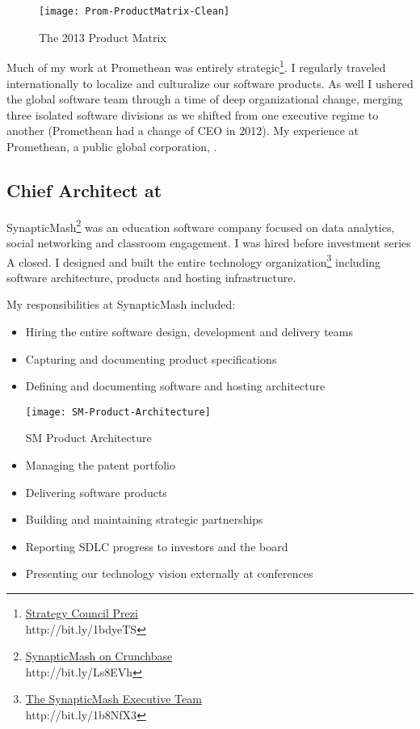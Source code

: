 \begin{centering}
\begin{figure}%
  \texttt{[image: Prom-ProductMatrix-Clean]}
  \caption{The 2013 Product Matrix}
  \label{fig:PromSide}
\end{figure}
\end{centering}

Much of my work at Promethean was entirely strategic\footnote{\href{http://prezi.com/v-jhcxlibwka/?utm_campaign=share&utm_medium=copy&rc=ex0share}{Strategy Council Prezi}\\ http://bit.ly/1bdyeTS}.  I regularly traveled internationally to localize and culturalize our software products.  As well I ushered the global software team through a time of deep organizational change, merging three isolated software divisions as we shifted from one executive regime to another (Promethean had a change of CEO in 2012).  My experience at Promethean, a public global corporation, .

\subsection{\textbf{Chief Architect} at  \shyears{[2008-2010]}}
SynapticMash\footnote{\href{http://www.crunchbase.com/company/synapticmash}{SynapticMash on Crunchbase}\\ http://bit.ly/Ls8EVh} was an education software company focused on data analytics, social networking and classroom engagement.  I was hired before investment series A closed.  I designed and built the entire technology organization\footnote{\href{http://synapticmash.com/index.php/about}{The SynapticMash Executive Team}\\ http://bit.ly/1b8NfX3} including software architecture, products and hosting infrastructure.

My responsibilities at SynapticMash included:
\begin{itemize}
\itemsep-0.5em
\item{Hiring the entire software design, development and delivery teams}
\item{Capturing and documenting product specifications}
\item{Defining and documenting software and hosting architecture}
\begin{marginfigure}%
  \texttt{[image: SM-Product-Architecture]}
  \caption{SM Product Architecture}
  \label{fig:SM-Product-Architecture}
\end{marginfigure}
\item{Managing the patent portfolio}
\item{Delivering software products}
\item{Building and maintaining strategic partnerships}
\item{Reporting SDLC progress to investors and the board}
\item{Presenting our technology vision externally at conferences}
\end{itemize}

